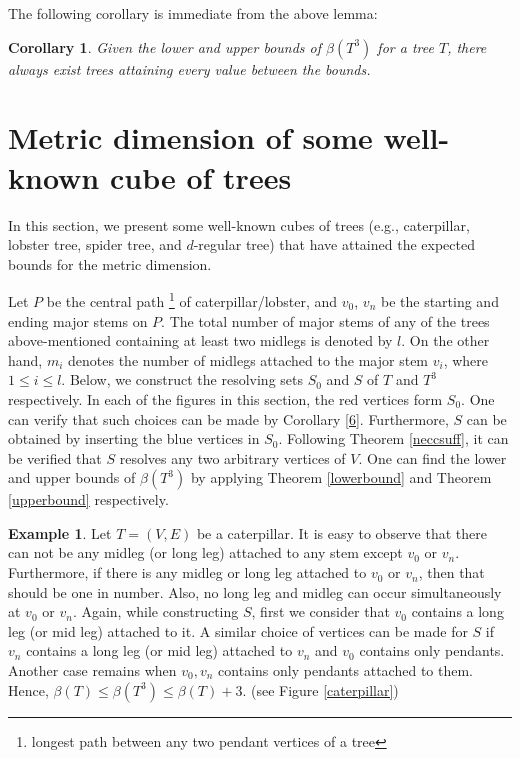\documentclass{article}
\newtheorem{cor}[thm]{Corollary}
\theoremstyle{definition}
\newtheorem{exmp}[thm]{Example}
\numberwithin{equation}{section}
\begin{document}
The following corollary is immediate from the above lemma:

\begin{cor}
Given the lower and upper bounds of $\beta{(T^{3})}$ for a tree $T$, there always exist trees attaining every value between the bounds.
\end{cor}

\section{Metric dimension of some well-known cube of trees}
In this section, we present some well-known cubes of trees (e.g., caterpillar, lobster tree, spider tree, and $d$-regular tree) that have attained the expected bounds for the metric dimension.

Let $P$ be the central path \footnote{longest path between any two pendant vertices of a tree} of caterpillar/lobster, and $v_0$, $v_n$ be the starting and ending major stems on $P$. The total number of major stems of any of the trees above-mentioned containing at least two midlegs is denoted by $l$. On the other hand, $m_{i}$ denotes the number of midlegs attached to the major stem $v_{i}$, where $1\leq i\leq l$. Below, we construct the resolving sets $S_0$ and $S$ of $T$ and $T^3$  respectively. In each of the figures in this section, the red vertices form $S_{0}$. One can verify that such choices can be made by Corollary \ref{6}. Furthermore, $S$ can be obtained by inserting the blue vertices in $S_{0}$.
Following Theorem \ref{neccsuff}, it can be verified that $S$ resolves any two arbitrary vertices of $V$. One can find the lower and upper bounds of $\beta(T^{3})$ by applying Theorem \ref{lowerbound} and Theorem \ref{upperbound} respectively.


\begin{exmp}
Let $T=(V, E)$ be a caterpillar. It is easy to observe that there can not be any midleg (or long leg) attached to any stem except $v_{0}$ or $v_{n}$. Furthermore, if there is any midleg or long leg attached to $v_{0}$ or $v_{n}$, then that should be one in number. Also, no long leg and midleg can occur simultaneously at $v_{0}$ or $v_{n}$. Again, while constructing $S$, first we consider that $v_{0}$ contains a long leg (or mid leg) attached to it.  A similar choice of vertices can be made for $S$ if $v_{n}$ contains a long leg (or mid leg) attached to $v_{n}$ and $v_{0}$ contains only pendants. Another case remains when $v_{0},v_{n}$ contains only pendants attached to them. Hence, $\beta{(T)}\leq \beta{(T^{3})}\leq \beta{(T)}+3$. (see Figure \ref{caterpillar})  
\end{exmp}
\end{document}

